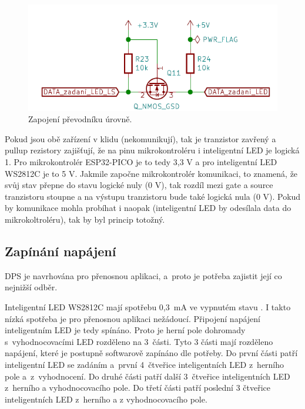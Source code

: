   \begin{figure}[!h]
    \begin{center}
      \includegraphics[scale=0.85]{obrazky/level_shifter.png}
    \end{center}
    \caption[Zapojení převodníků úrovně]{Zapojení převodníku úrovně.}
  \end{figure}

  Pokud jsou obě zařízení v klidu (nekomunikují), tak je tranzistor zavřený a pullup rezistory zajišťují, že na pinu mikrokontroléru
  i inteligentní LED je logická 1. Pro mikrokontrolér ESP32-PICO je to tedy 3,3 V a pro inteligentní LED WS2812C je to 5 V. Jakmile započne
  mikrokontrolér komunikaci, to znamená, že svůj stav přepne do stavu logické nuly (0 V), tak rozdíl mezi gate a source tranzistoru stoupne
  a na výstupu tranzistoru bude také logická nula (0 V). Pokud by komunikace mohla probíhat i naopak (inteligentní LED by odesílala data do
  mikrokoltroléru), tak by byl princip totožný. 

  \subsection{Zapínání napájení}
  DPS je navrhována pro přenosnou aplikaci, a~proto je potřeba zajistit její co nejnižší odběr. 

  Inteligentní LED WS2812C mají spotřebu 0,3~mA ve vypnutém stavu \cite{WS2812C_datasheet}. I takto nízká spotřeba je  pro přenosnou aplikaci 
  nežádoucí. Připojení
  napájení inteligentním LED je tedy spínáno. Proto je herní pole dohromady
  s~vyhodnocovacími LED rozděleno na 3~části. Tyto 3 části mají rozděleno napájení, které je postupně softwarově zapínáno dle potřeby. 
  Do první části patří inteligentní LED se zadáním a~první 4~čtveřice inteligentních LED 
  z~herního pole a~z~vyhodnocení. Do druhé části patří další 3~čtveřice inteligentních LED z~herního a vyhodnocovacího pole. 
  Do třetí části patří poslední 3 čtveřice inteligentních LED z~herního a z vyhodnocovacího pole.

